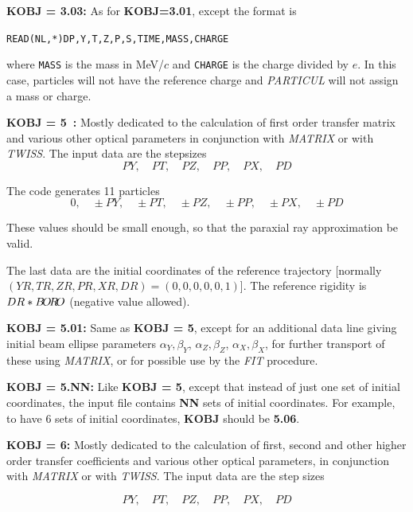 \noindent\textbf{KOBJ = 3.03:} As for \textbf{KOBJ=3.01}, except the format
is 
\begin{alltt}
         READ(NL,*) DP,Y,T,Z,P,S,TIME,MASS,CHARGE
\end{alltt}
where \texttt{MASS} is the mass in MeV/$c$ and \texttt{CHARGE} is the
charge divided by $e$.  In this case, particles will not have the reference
charge and \textsl{PARTICUL} will not assign a mass or charge.
\bigskip


\noindent\textbf{KOBJ = 5~:} Mostly dedicated to the calculation of first order
transfer matrix and various other  optical parameters 
 in conjunction with \textsl{MATRIX} or with \textsl{TWISS}.  
The input data are the stepsizes 
\smallskip
$$ PY,\quad PT,\quad PZ,\quad PP, \quad PX, \quad PD $$

\noindent The code generates  11 particles 
$$ 0,\quad \pm PY,\quad \pm PT,\quad \pm PZ,\quad \pm PP, \quad \pm PX, \quad \pm PD $$

\noindent These values should be small enough, so that the paraxial ray
approximation be valid. 

\noindent The last data are the initial coordinates of the reference 
trajectory [normally $(YR, TR, ZR, PR, XR, DR) = (0, 0, 0, 0, 0, 1)$]. 
The reference rigidity  is $ DR\ast B\!O\!R\!O$ 
(negative value allowed).  

\bigskip

\noindent\textbf{KOBJ = 5.01:} Same as \textbf{KOBJ = 5}, except for an additional data line giving 
initial beam ellipse parameters $\alpha_Y, \beta_Y$, $\alpha_Z, \beta_Z$, $\alpha_X, \beta_X$,  
 for further transport of these using \textsl{MATRIX}, or for  possible use by the \textsl{FIT} procedure. 

\bigskip

\noindent\textbf{KOBJ = 5.NN:} Like \textbf{KOBJ = 5}, except that instead of
just one set of initial coordinates, the input file contains \textbf{NN} sets
of initial coordinates.  For example, to have 6 sets of initial coordinates,
\textbf{KOBJ} should be \textbf{5.06}.

\bigskip

\noindent\textbf{KOBJ = 6:}  Mostly dedicated to the calculation of first, second
and other higher order transfer coefficients and various other  optical parameters, 
in conjunction with \textsl{MATRIX} or with \textsl{TWISS}. 
The input data are the step sizes 

$$ PY,\quad PT,\quad PZ,\quad PP, \quad PX, \quad PD $$
 

